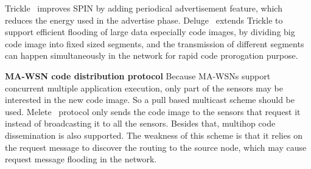 Trickle~\cite{trickle} improves SPIN by adding periodical advertisement feature, which reduces the energy used in the advertise phase. Deluge~\cite{deluge} extends Trickle to support efficient flooding of large data especially code images, by dividing big code image into fixed sized segments, and the transmission of different segments can happen simultaneously in the network for rapid code prorogation purpose. 


\textbf{MA-WSN code distribution protocol}
Because MA-WSNs support concurrent multiple application execution, only part of the sensors may be interested in the new code image. So a pull based multicast scheme should be used. Melete~\cite{melete} protocol only sends the code image to the sensors that request it instead of broadcasting it to all the sensors. Besides that, multihop code dissemination is also supported. The weakness of this scheme is that it relies on the request message to discover the routing to the source node, which may cause request message flooding in the network.


